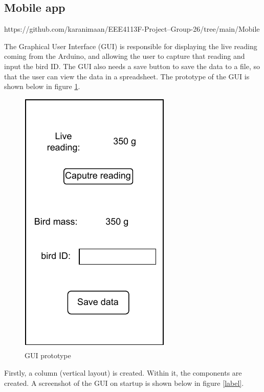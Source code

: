 \documentclass[class=report,11pt,crop=false]{standalone}
\begin{document}
		
		
		\subsection{Mobile app}
		
			
			https://github.com/karanimaan/EEE4113F-Project--Group-26/tree/main/Mobile%
			
			The Graphical User Interface (GUI) is responsible for displaying the live reading coming from the Arduino, and allowing the user to capture that reading and input the bird ID. The GUI also needs a save button to save the data to a file, so that the user can view the data in a spreadsheet.
			The prototype of the GUI is shown below in figure \ref{fig:gui-prototype}.
			
			\begin{figure}[h!]
				\centering
				\includegraphics[scale=1]{"Figures/GUI prototype"}
				\caption{GUI prototype}
				\label{fig:gui-prototype}
			\end{figure}
		
			Firstly, a column (vertical layout) is created. Within it, the components are created. A screenshot of the GUI on startup is shown below in figure \ref{label}.
		
\end{document}
